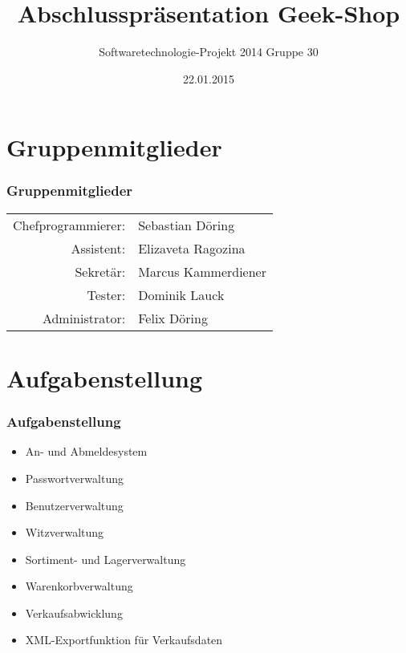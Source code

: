 \documentclass[]{tudbeamer}
\begin{document}
\title[Abschlusspr\"asentation Geek-Shop]{Abschlusspr\"asentation Geek-Shop}
\subtitle{Softwaretechnologie-Projekt 2014 Gruppe 30}
\date{22.01.2015}

\maketitle

\begin{frame}
\tableofcontents
\end{frame}

\section{Gruppenmitglieder}
\begin{frame}
\frametitle{Gruppenmitglieder}
\begin{tabular}{rp{10cm}}
Chefprogrammierer: & Sebastian D\"oring \\
Assistent: & Elizaveta Ragozina \\
Sekret\"ar: & Marcus Kammerdiener \\
Tester: & Dominik Lauck \\
Administrator: & Felix D\"oring \\
\end{tabular}
\end{frame}

\section{Aufgabenstellung}
\begin{frame}
\frametitle{Aufgabenstellung}
\begin{itemize}
\item An- und Abmeldesystem
\item Passwortverwaltung
\item Benutzerverwaltung
\item Witzverwaltung
\item Sortiment- und Lagerverwaltung
\item Warenkorbverwaltung
\item Verkaufsabwicklung
\item XML-Exportfunktion f\"ur Verkaufsdaten
\end{itemize}
\end{frame}
\end{document}

